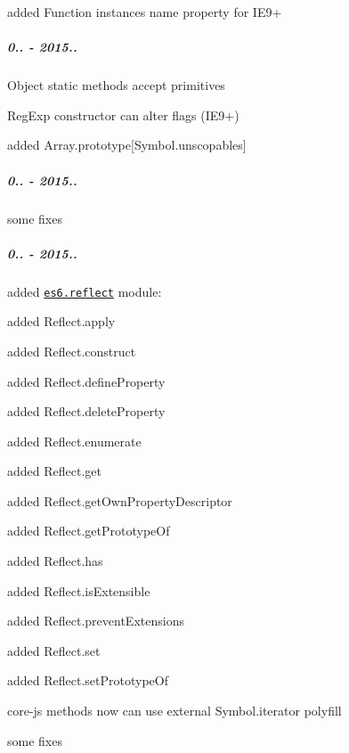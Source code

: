 \begin{DoxyItemize}
\item added {\ttfamily Function} instances {\ttfamily name} property for I\+E9+
\end{DoxyItemize}

\subparagraph*{0.. -\/ 2015..}


\begin{DoxyItemize}
\item {\ttfamily Object} static methods accept primitives
\item {\ttfamily Reg\+Exp} constructor can alter flags (I\+E9+)
\item added {\ttfamily Array.\+prototype\mbox{[}Symbol.\+unscopables\mbox{]}}
\end{DoxyItemize}

\subparagraph*{0.. -\/ 2015..}


\begin{DoxyItemize}
\item some fixes
\end{DoxyItemize}

\subparagraph*{0.. -\/ 2015..}


\begin{DoxyItemize}
\item added \href{https://github.com/zloirock/core-js/#ecmascript-6-reflect}{\tt {\ttfamily es6.\+reflect}} module\+:
\begin{DoxyItemize}
\item added {\ttfamily Reflect.\+apply}
\item added {\ttfamily Reflect.\+construct}
\item added {\ttfamily Reflect.\+define\+Property}
\item added {\ttfamily Reflect.\+delete\+Property}
\item added {\ttfamily Reflect.\+enumerate}
\item added {\ttfamily Reflect.\+get}
\item added {\ttfamily Reflect.\+get\+Own\+Property\+Descriptor}
\item added {\ttfamily Reflect.\+get\+Prototype\+Of}
\item added {\ttfamily Reflect.\+has}
\item added {\ttfamily Reflect.\+is\+Extensible}
\item added {\ttfamily Reflect.\+prevent\+Extensions}
\item added {\ttfamily Reflect.\+set}
\item added {\ttfamily Reflect.\+set\+Prototype\+Of}
\end{DoxyItemize}
\item {\ttfamily core-\/js} methods now can use external {\ttfamily Symbol.\+iterator} polyfill
\item some fixes
\end{DoxyItemize}

